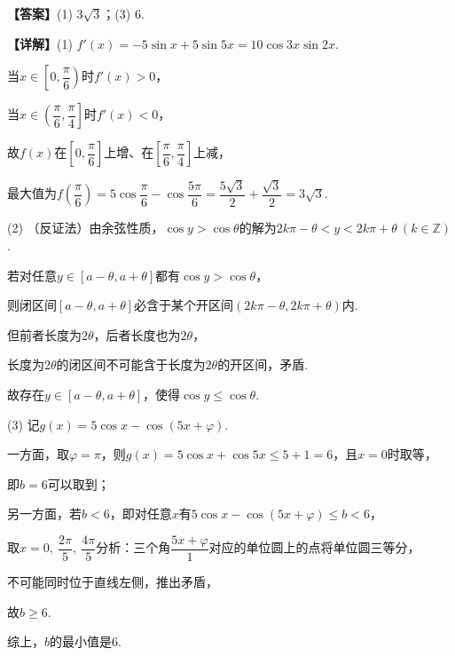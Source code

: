 \documentclass[12pt,a4paper]{article}
\begin{document}
\begin{enumerate}[leftmargin=*,label=\arabic*.,resume,itemsep=1.2ex]
		\textbf{【答案】}(1) $3\sqrt3$；(3) $6$.
		
		\textbf{【详解】}(1) $f'(x)=-5\sin x+5\sin5x=10\cos3x\sin2x$.
		
		当$x\in\left[0,\dfrac{\pi}{6}\right)$时$f'(x)>0$，
		
		当$x\in\left(\dfrac{\pi}{6},\dfrac{\pi}{4}\right]$时$f'(x)<0$，
		
		故$f(x)$在$\left[0,\dfrac{\pi}{6}\right]$上增、在$\left[\dfrac{\pi}{6},\dfrac{\pi}{4}\right]$上减，
		
		最大值为$f\left(\dfrac{\pi}{6}\right)=5\cos\dfrac{\pi}{6}-\cos\dfrac{5\pi}{6}=\dfrac{5\sqrt3}{2}+\dfrac{\sqrt3}{2}=3\sqrt3$.
		
		(2) （反证法）由余弦性质，$\cos y>\cos\theta$的解为$2k\pi-\theta<y<2k\pi+\theta\ (k\in\mathbb{Z})$.
		
		若对任意$y\in[a-\theta,a+\theta]$都有$\cos y>\cos\theta$，
		
		则闭区间$[a-\theta,a+\theta]$必含于某个开区间$(2k\pi-\theta,2k\pi+\theta)$内.
		
		但前者长度为$2\theta$，后者长度也为$2\theta$，
		
		长度为$2\theta$的闭区间不可能含于长度为$2\theta$的开区间，矛盾.
		
		故存在$y\in[a-\theta,a+\theta]$，使得$\cos y\le\cos\theta$.
		
		(3) 记$g(x)=5\cos x-\cos(5x+\varphi)$.
		
		一方面，取$\varphi=\pi$，则$g(x)=5\cos x+\cos5x\le5+1=6$，且$x=0$时取等，
		
		即$b=6$可以取到；
		
		另一方面，若$b<6$，即对任意$x$有$5\cos x-\cos(5x+\varphi)\le b<6$，
		
		取$x=0,\ \dfrac{2\pi}{5},\ \dfrac{4\pi}{5}$分析：三个角$\dfrac{5x+\varphi}{1}$对应的单位圆上的点将单位圆三等分，
		
		不可能同时位于直线左侧，推出矛盾，
		
		故$b\ge6$.
		
		综上，$b$的最小值是$6$.
		
	\end{enumerate}
\end{document}
